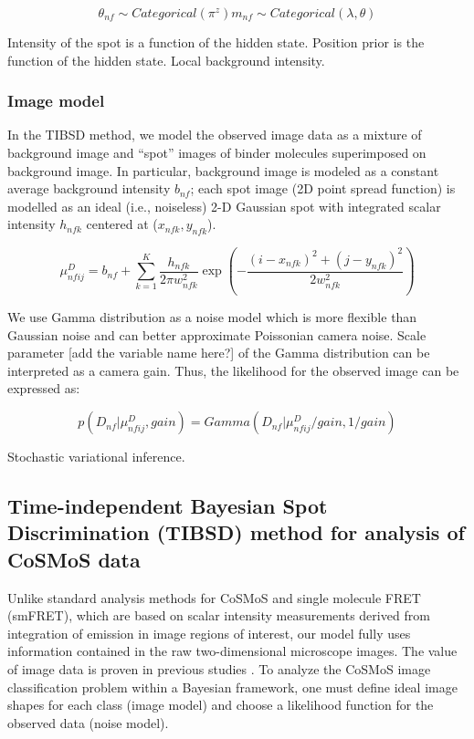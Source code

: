 \begin{equation*}
    \theta_{nf} \sim Categorical(\pi^z)
    m_{nf} \sim Categorical(\lambda, \theta)
\end{equation*}

Intensity of the spot is a function of the hidden state. Position prior is the function of the hidden state. Local background intensity.

\subsubsection{Image model}

In the TIBSD method, we model the observed image data as a mixture of background image and “spot” images of binder molecules superimposed on background image. In particular, background image is modeled as a constant average background intensity $b_{nf}$; each spot image (2D point spread function) is modelled as an ideal (i.e., noiseless) 2-D Gaussian spot with integrated scalar intensity $h_{nfk}$ centered at ($x_{nfk}, y_{nfk}$).  

\textbf{\begin{equation*}
    \mu^{D}_{nfij} = b_{nf} + \sum_{k=1}^{K} \dfrac{h_{nfk}}{2 \pi w^2_{nfk}} \exp{\left ( -\dfrac{(i-x_{nfk})^2 + (j-y_{nfk})^2}{2w^2_{nfk}} \right)}
\end{equation*}}

We use Gamma distribution as a noise model which is more flexible than Gaussian noise and can better approximate Poissonian camera noise. Scale parameter [add the variable name here?] of the Gamma distribution can be interpreted as a camera gain. Thus, the likelihood for the observed image can be expressed as:
 
 \begin{equation*}
     p(D_{nf}|\mu^D_{nfij},gain) = Gamma(D_{nf}|\mu^D_{nfij}/gain,1/gain)
 \end{equation*}

Stochastic variational inference.

\subsection{Time-independent Bayesian Spot Discrimination (TIBSD) method for analysis of CoSMoS data}

Unlike standard analysis methods for CoSMoS and single molecule FRET (smFRET), which are based on scalar intensity measurements derived from integration of emission in image regions of interest, our model fully uses information contained in the raw two-dimensional microscope images. The value of image data is proven in previous studies \citep{Friedman2015-nx,Smith2019-yb}. To analyze the CoSMoS image classification problem within a Bayesian framework, one must define ideal image shapes for each class (image model) and choose a likelihood function for the observed data (noise model).

